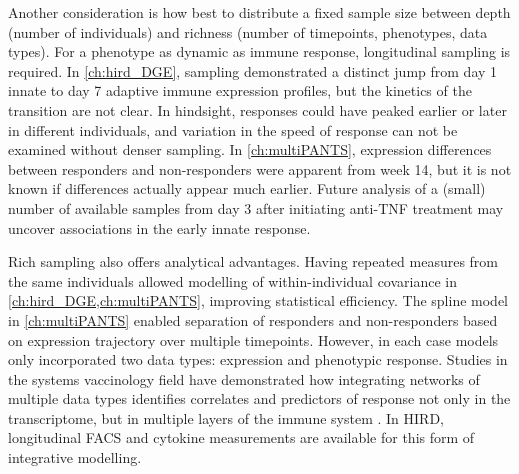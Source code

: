 Another consideration is how best to distribute a fixed sample size between depth (number of individuals) and richness (number of timepoints, phenotypes, data types).
For a phenotype as dynamic as immune response, longitudinal sampling is required.
In \cref{ch:hird_DGE}, sampling demonstrated a distinct jump from day 1 innate to day 7 adaptive immune expression profiles,
but the kinetics of the transition are not clear. 
In hindsight, responses could have peaked earlier or later in different individuals,
and variation in the speed of response can not be examined without denser sampling.
In \cref{ch:multiPANTS}, expression differences between responders and non-responders were apparent from week 14, but it is not known if differences actually appear much earlier.
Future analysis of a (small) number of available samples from day 3 after initiating anti-\gls{TNF} treatment may uncover associations in the early innate response.

Rich sampling also offers analytical advantages.
Having repeated measures from the same individuals allowed modelling of within-individual covariance in \cref{ch:hird_DGE,ch:multiPANTS}, improving statistical efficiency.
The spline model in \cref{ch:multiPANTS} enabled separation of responders and non-responders based on expression trajectory over multiple timepoints.
However, in each case models only incorporated two data types: expression and phenotypic response.
Studies in the systems vaccinology field have demonstrated how integrating networks of multiple data types identifies correlates and predictors of response not only in the transcriptome, 
but in multiple layers of the immune system \autocite{li2017MetabolicPhenotypesResponse}.
In \gls{HIRD}, longitudinal \gls{FACS} and cytokine measurements are available for this form of integrative modelling.


